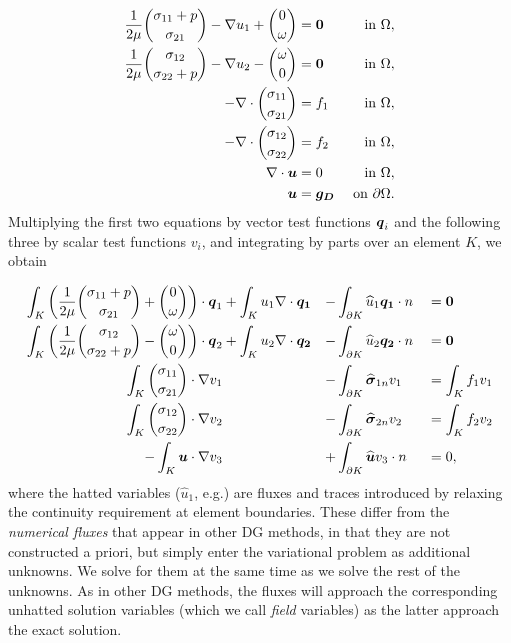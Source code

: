 \begin{align*}
\frac{1}{2 \mu}{\sigma_{11} + p \choose \sigma_{21}} - \NVRgrad u_{1} + {0 \choose \omega} &= \vect{0} & \text{ in } \Omega, \\
\frac{1}{2 \mu}{\sigma_{12} \choose \sigma_{22} + p} - \NVRgrad u_{2} - {\omega \choose 0} &= \vect{0}  & \text{ in } \Omega, \\
-\NVRdiv {\sigma_{11} \choose \sigma_{21}} &= f_{1} & \text{ in } \Omega, \\
-\NVRdiv {\sigma_{12} \choose \sigma_{22}} &= f_{2} & \text{ in } \Omega, \\
\NVRdiv \vect{u} &= 0 & \text{ in } \Omega, \\\
\vect{u} &= \vect{g_{D}} & \text{ on } \partial\Omega.
\end{align*}
Multiplying the first two equations by vector test functions $\vect{q}_{i}$ and the following three by scalar test functions $v_{i}$, and integrating by parts over an element $K$, we obtain

\begin{align*}
\int_{K} \left(\frac{1}{2 \mu}{\sigma_{11} + p \choose \sigma_{21}} + {0 \choose \omega} \right) \cdot \vect{q}_{1} &+ \int_{K} u_{1} \NVRdiv \vect{q_{1}} &-& \int_{\partial K} \widehat{u}_{1} \vect{q_{1}} \cdot n &&=\vect{0} \\
\int_{K} \left(\frac{1}{2 \mu}{\sigma_{12} \choose \sigma_{22} + p} - {\omega \choose 0}\right) \cdot \vect{q}_{2} &+ \int_{K} u_{2} \NVRdiv \vect{q_{2}} &-& \int_{\partial K} \widehat{u}_{2} \vect{q_{2}} \cdot n &&= \vect{0}\\
\int_{K}  {\sigma_{11} \choose \sigma_{21}} \cdot \NVRgrad v_{1} &&-& \int_{\partial K} \widehat{\vect{\sigma}}_{1n} v_{1} &&= \int_{K} f_{1} v_{1} \\
\int_{K} {\sigma_{12} \choose \sigma_{22}} \cdot \NVRgrad v_{2} &&-& \int_{\partial K} \widehat{\vect{\sigma}}_{2n} v_{2}  &&= \int_{K} f_{2} v_{2} \\
-\int_{K} \vect{u} \cdot \NVRgrad v_{3} &&+& \int_{\partial K} \widehat{\vect{u}} v_{3} \cdot n &&= 0,
\end{align*}
where the hatted variables ($\widehat{u}_{1}$, e.g.) are fluxes and traces introduced by relaxing the continuity requirement at element boundaries.  These differ from the \emph{numerical fluxes} that appear in other DG methods, in that they are not constructed a priori, but simply enter the variational problem as additional unknowns. We solve for them at the same time as we solve 
the rest of the unknowns.  As in other DG methods, the fluxes will approach the corresponding unhatted solution variables (which we call \emph{field} variables) as the latter approach the exact solution.

